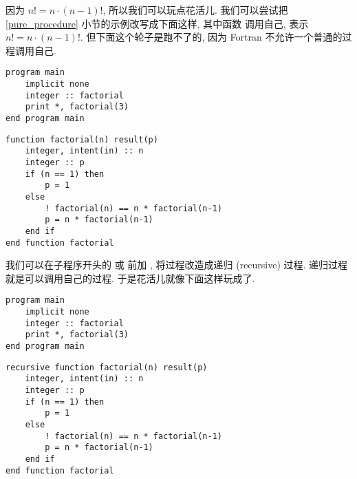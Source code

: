 因为 $n!=n\cdot(n-1)!$, 所以我们可以玩点花活儿. 我们可以尝试把 \ref{pure_procedure} 小节的示例改写成下面这样, 其中函数  调用自己, 表示 $n!=n\cdot(n-1)!$. 但下面这个轮子是跑不了的, 因为 Fortran 不允许一个普通的过程调用自己.
\begin{lstlisting}
program main
    implicit none
    integer :: factorial
    print *, factorial(3)
end program main
\end{lstlisting}
\begin{lstlisting}
function factorial(n) result(p)
    integer, intent(in) :: n
    integer :: p
    if (n == 1) then
        p = 1
    else
        ! factorial(n) == n * factorial(n-1)
        p = n * factorial(n-1)
    end if
end function factorial
\end{lstlisting}
我们可以在子程序开头的  或  前加 , 将过程改造成递归 (recursive) 过程. 递归过程就是可以调用自己的过程. 于是花活儿就像下面这样玩成了.
\begin{lstlisting}
program main
    implicit none
    integer :: factorial
    print *, factorial(3)
end program main
\end{lstlisting}
\begin{lstlisting}
recursive function factorial(n) result(p)
    integer, intent(in) :: n
    integer :: p
    if (n == 1) then
        p = 1
    else
        ! factorial(n) == n * factorial(n-1)
        p = n * factorial(n-1)
    end if
end function factorial
\end{lstlisting}

